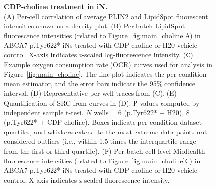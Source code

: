 \begin{figure}[ht]
    \caption{
         \textbf{CDP-choline treatment in iN.}\\[1ex]
         (A) Per-cell correlation of average PLIN2 and LipidSpot fluorescent intensities shown as a density plot. 
         (B) Per-batch LipidSpot fluorescence intensities (related to Figure~\ref{fig:main_choline}A) in ABCA7 p.Tyr622* iNs treated with CDP-choline or H20 vehicle control. X-axis indicates z-scaled log-fluorescence intensity. 
         (C) Example oxygen consumption rate (OCR) curves used for analysis in Figure~\ref{fig:main_choline}. The line plot indicates the per-condition mean estimator, and the error bars indicate the 95\% confidence interval. 
         (D) Representative per-well traces from (C). 
         (E) Quantification of SRC from curves in (D). P-values computed by independent sample t-test. $N$ wells = 6 (p.Tyr622* + H20), 8 (p.Tyr622* + CDP-choline). Boxes indicate per-condition dataset quartiles, and whiskers extend to the most extreme data points not considered outliers (i.e., within 1.5 times the interquartile range from the first or third quartile). 
         (F) Per-batch cell-level MioHealth fluorescence intensities (related to Figure~\ref{fig:main_choline}C) in ABCA7 p.Tyr622* iNs treated with CDP-choline or H20 vehicle control. X-axis indicates z-scaled fluorescence intensity.
     }
     \label{fig:lipid_mitochondrial_effects_CDP_choline}
 \end{figure}

 

